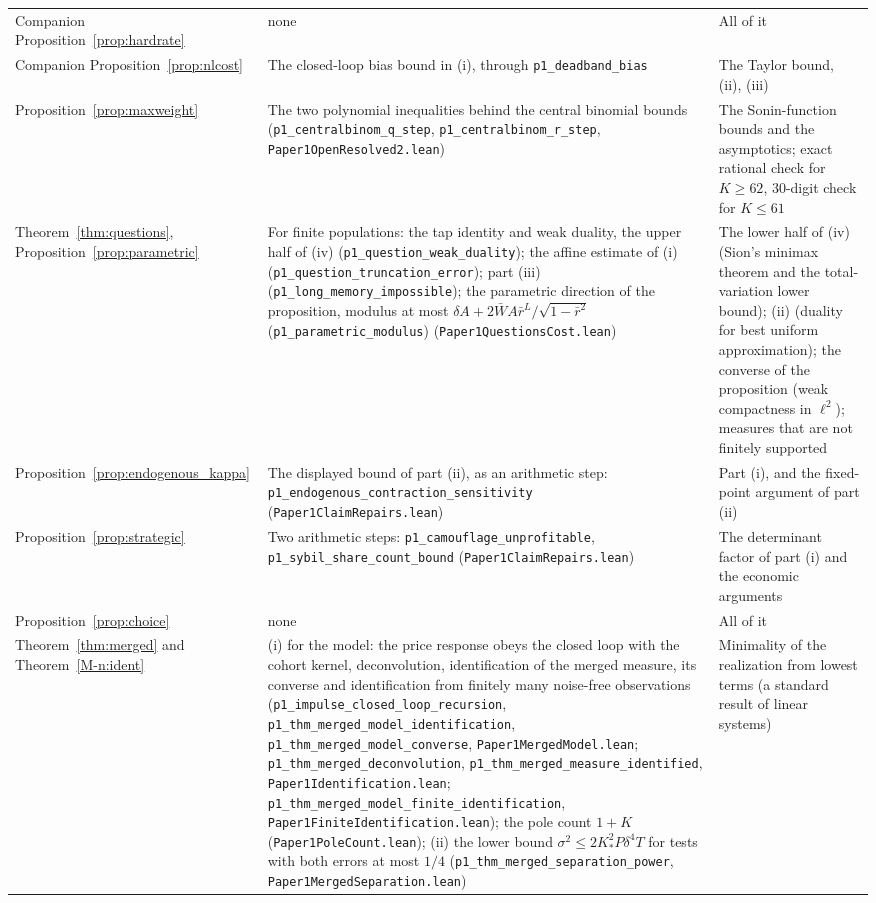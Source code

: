 \begin{longtable}{>{\raggedright\arraybackslash}p{}>{\raggedright\arraybackslash}p{}>{\raggedright\arraybackslash}p{}}
Companion Proposition~\ref{prop:hardrate} & none & All of it\\
Companion Proposition~\ref{prop:nlcost} & The closed-loop bias bound in (i), through \texttt{p1\_deadband\_bias} & The Taylor bound, (ii), (iii)\\
Proposition~\ref{prop:maxweight} & The two polynomial inequalities behind the central binomial bounds (\texttt{p1\_centralbinom\_q\_step}, \texttt{p1\_centralbinom\_r\_step}, \nolinkurl{Paper1OpenResolved2.lean}) & The Sonin-function bounds and the asymptotics; exact rational check for $K\ge62$, 30-digit check for $K\le61$\\
Theorem~\ref{thm:questions}, Proposition~\ref{prop:parametric} & For finite populations: the tap identity and weak duality, the upper half of (iv) (\texttt{p1\_question\_weak\_duality}); the affine estimate of (i) (\texttt{p1\_question\_truncation\_error}); part (iii) (\texttt{p1\_long\_memory\_impossible}); the parametric direction of the proposition, modulus at most $\delta A+2\bar WA\bar r^L/\sqrt{1-\bar r^2}$ (\texttt{p1\_parametric\_modulus}) (\nolinkurl{Paper1QuestionsCost.lean}) & The lower half of (iv) (Sion's minimax theorem and the total-variation lower bound); (ii) (duality for best uniform approximation); the converse of the proposition (weak compactness in $\ell^2$); measures that are not finitely supported\\
Proposition~\ref{prop:endogenous_kappa} & The displayed bound of part (ii), as an arithmetic step: \nolinkurl{p1_endogenous_contraction_sensitivity} (\nolinkurl{Paper1ClaimRepairs.lean}) & Part (i), and the fixed-point argument of part (ii)\\
Proposition~\ref{prop:strategic} & Two arithmetic steps: \nolinkurl{p1_camouflage_unprofitable}, \nolinkurl{p1_sybil_share_count_bound} (\nolinkurl{Paper1ClaimRepairs.lean}) & The determinant factor of part (i) and the economic arguments\\
Proposition~\ref{prop:choice} & none & All of it\\
Theorem~\ref{thm:merged} and Theorem~\ref{M-n:ident} & (i) for the model: the price response obeys the closed loop with the cohort kernel, deconvolution, identification of the merged measure, its converse and identification from finitely many noise-free observations (\nolinkurl{p1_impulse_closed_loop_recursion}, \nolinkurl{p1_thm_merged_model_identification}, \nolinkurl{p1_thm_merged_model_converse}, \nolinkurl{Paper1MergedModel.lean}; \nolinkurl{p1_thm_merged_deconvolution}, \nolinkurl{p1_thm_merged_measure_identified}, \nolinkurl{Paper1Identification.lean}; \nolinkurl{p1_thm_merged_model_finite_identification}, \nolinkurl{Paper1FiniteIdentification.lean}); the pole count $1+K$ (\nolinkurl{Paper1PoleCount.lean}); (ii) the lower bound $\sigma^2\le2K_*^2P\delta^4T$ for tests with both errors at most $1/4$ (\nolinkurl{p1_thm_merged_separation_power}, \nolinkurl{Paper1MergedSeparation.lean}) & Minimality of the realization from lowest terms (a standard result of linear systems)\\

\end{longtable}
